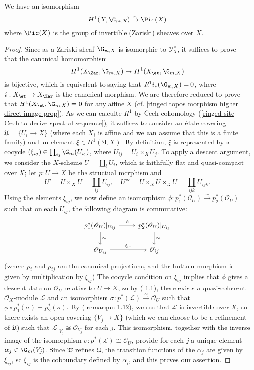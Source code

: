 \begin{theorem}\label{scheme etale Hilbert theorem 90}
We have an isomorphism
\[H^1(X,\G_{m,X}) \stackrel{\sim}{\to} \Pic(X)\]
where $\Pic(X)$ is the group of invertible (Zariski) sheaves over $X$.
\end{theorem}
\begin{proof}
Since as a Zariski sheaf $\G_{m,X}$ is isomorphic to $\mathscr{O}_X^\times$, it suffices to prove that the canonical homomorphism
\[H^1(X_\Zar,\G_{m,X})\to H^1(X_\et,\G_{m,X})\]
is bijective, which is equivalent to saying that $R^1i_*(\G_{m,X})=0$, where $i:X_\et\to X_\Zar$ is the canonical morphism. We are therefore reduced to prove that $H^1(X_\et,\G_{m,X})=0$ for any affine $X$ (cf. \cref{ringed topos morphism higher direct image prop}). As we can calculte $H^1$ by \v{C}ech cohomology (\cref{ringed site Cech to derive spectral sequence}), it suffices to consider an \'etale covering $\mathfrak{U}=\{U_i\to X\}$ (where each $X_i$ is affine and we can assume that this is a finite family) and an element $\xi\in H^1(\mathfrak{U},X)$. By definition, $\xi$ is represented by a cocycle $(\xi_{ij})\in\prod_{ij}\G_m(U_{ij})$, where $U_{ij}=U_i\times_XU_j$. To apply a descent argument, we consider the $X$-scheme $U=\coprod_iU_i$, which is faithfully flat and quasi-compact over $X$; let $p:U\to X$ be the structual morphism and
\[U'=U\times_XU=\coprod_{ij}U_{ij},\quad U'''=U\times_XU\times_XU=\coprod_{ijk}U_{ijk}.\]
Using the elements $\xi_{ij}$, we now define an isomorphism $\phi:p_1^*(\mathscr{O}_U)\stackrel{\sim}{\to}p_2^*(\mathscr{O}_U)$ such that on each $U_{ij}$, the following diagram is commutative:
\[\begin{tikzcd}
p_1^*(\mathscr{O}_U)|_{U_{ij}}\ar[r,"\phi"]\ar[d,"\sim"]&p_2^*(\mathscr{O}_U)|_{U_{ij}}\ar[d,"\sim"]\\
\mathscr{O}_{U_{ij}}\ar[r,"\xi_{ij}"]&\mathscr{O}_{ij}
\end{tikzcd}\]
(where $p_i$ and $p_{ij}$ are the canonical projections, and the bottom morphism is given by multiplication by $\xi_{ij}$) The cocycle condition on $\xi_{ij}$ implies that $\phi$ gives a descent data on $\mathscr{O}_U$ relative to $U\to X$, so by (\cite{SGA1}  1.1), there exists a quasi-coherent $\mathscr{O}_X$-module $\mathscr{L}$ and an isomorphism $\sigma:p^*(\mathscr{L})\stackrel{\sim}{\to}\mathscr{O}_U$ such that $\phi\circ p_1^*(\sigma)=p_2^*(\sigma)$. By (\cite{SGA1}  remarque 1.12), we see that $\mathscr{L}$ is invertible over $X$, so there exists an open covering $\{V_j\to X\}$ (which we can choose to be a refinement of $\mathfrak{U}$) such that $\mathscr{L}|_{V_j}\cong\mathscr{O}_{V_j}$ for each $j$. This isomorphism, together with the inverse image of the isomorphism $\sigma:p^*(\mathscr{L})\cong\mathscr{O}_U$, provide for each $j$ a unique element $\alpha_j\in\G_m(V_j)$. Since $\mathfrak{V}$ refines $\mathfrak{U}$, the transition functions of the $\alpha_j$ are given by $\xi_{ij}$, so $\xi_{ij}$ is the coboundary defined by $\alpha_j$, and this proves our assertion.
\end{proof}

